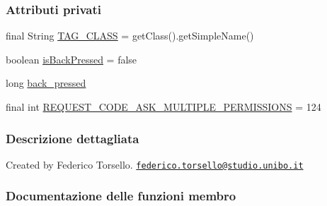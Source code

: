 \subsubsection*{Attributi privati}
\begin{DoxyCompactItemize}
\item 
final String \hyperlink{classit_1_1unibo_1_1torsello_1_1bluetoothpositioning_1_1activities_1_1MainActivity_ab45ec7669a9285270b5dc817334762b3_ab45ec7669a9285270b5dc817334762b3}{T\+A\+G\+\_\+\+C\+L\+A\+SS} = get\+Class().get\+Simple\+Name()
\item 
boolean \hyperlink{classit_1_1unibo_1_1torsello_1_1bluetoothpositioning_1_1activities_1_1MainActivity_a73d74411ec7bb55eb827bb81018174bd_a73d74411ec7bb55eb827bb81018174bd}{is\+Back\+Pressed} = false
\item 
long \hyperlink{classit_1_1unibo_1_1torsello_1_1bluetoothpositioning_1_1activities_1_1MainActivity_a5e1ae38b2bbdcc45f2164fdc393ca495_a5e1ae38b2bbdcc45f2164fdc393ca495}{back\+\_\+pressed}
\item 
final int \hyperlink{classit_1_1unibo_1_1torsello_1_1bluetoothpositioning_1_1activities_1_1MainActivity_a319aed5cdd5724e043302babe5fcfeac_a319aed5cdd5724e043302babe5fcfeac}{R\+E\+Q\+U\+E\+S\+T\+\_\+\+C\+O\+D\+E\+\_\+\+A\+S\+K\+\_\+\+M\+U\+L\+T\+I\+P\+L\+E\+\_\+\+P\+E\+R\+M\+I\+S\+S\+I\+O\+NS} = 124
\end{DoxyCompactItemize}


\subsubsection{Descrizione dettagliata}
Created by Federico Torsello. \href{mailto:federico.torsello@studio.unibo.it}{\tt federico.\+torsello@studio.\+unibo.\+it} 

\subsubsection{Documentazione delle funzioni membro}
\hypertarget{classit_1_1unibo_1_1torsello_1_1bluetoothpositioning_1_1activities_1_1MainActivity_ab762aac3d11f5b0ccc6042a140804d5d_ab762aac3d11f5b0ccc6042a140804d5d}{}\label{classit_1_1unibo_1_1torsello_1_1bluetoothpositioning_1_1activities_1_1MainActivity_ab762aac3d11f5b0ccc6042a140804d5d_ab762aac3d11f5b0ccc6042a140804d5d} 
